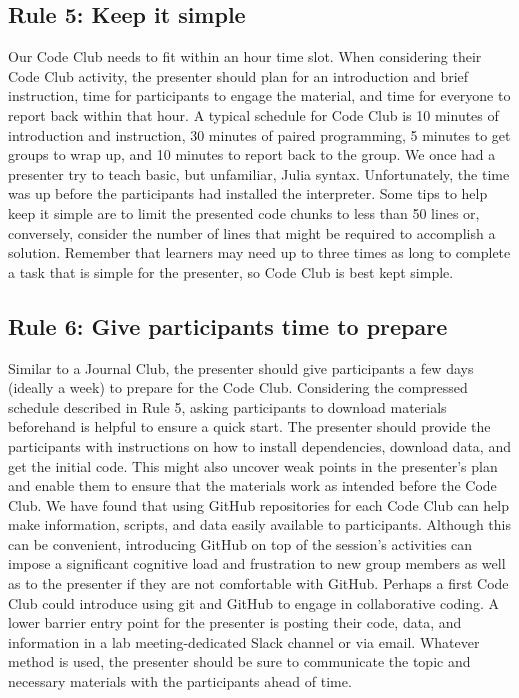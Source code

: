 \documentclass[
  11pt,
]{article}
\begin{document}
\hypertarget{rule-5-keep-it-simple}{%
\subsection{Rule 5: Keep it simple}\label{rule-5-keep-it-simple}}

Our Code Club needs to fit within an hour time slot. When considering
their Code Club activity, the presenter should plan for an introduction
and brief instruction, time for participants to engage the material, and
time for everyone to report back within that hour. A typical schedule
for Code Club is 10 minutes of introduction and instruction, 30 minutes
of paired programming, 5 minutes to get groups to wrap up, and 10
minutes to report back to the group. We once had a presenter try to
teach basic, but unfamiliar, Julia syntax. Unfortunately, the time was
up before the participants had installed the interpreter. Some tips to
help keep it simple are to limit the presented code chunks to less than
50 lines or, conversely, consider the number of lines that might be
required to accomplish a solution. Remember that learners may need up to
three times as long to complete a task that is simple for the presenter,
so Code Club is best kept simple.

\hypertarget{rule-6-give-participants-time-to-prepare}{%
\subsection{Rule 6: Give participants time to
prepare}\label{rule-6-give-participants-time-to-prepare}}

Similar to a Journal Club, the presenter should give participants a few
days (ideally a week) to prepare for the Code Club. Considering the
compressed schedule described in Rule 5, asking participants to download
materials beforehand is helpful to ensure a quick start. The presenter
should provide the participants with instructions on how to install
dependencies, download data, and get the initial code. This might also
uncover weak points in the presenter's plan and enable them to ensure
that the materials work as intended before the Code Club. We have found
that using GitHub repositories for each Code Club can help make
information, scripts, and data easily available to participants.
Although this can be convenient, introducing GitHub on top of the
session's activities can impose a significant cognitive load and
frustration to new group members as well as to the presenter if they are
not comfortable with GitHub. Perhaps a first Code Club could introduce
using git and GitHub to engage in collaborative coding. A lower barrier
entry point for the presenter is posting their code, data, and
information in a lab meeting-dedicated Slack channel or via email.
Whatever method is used, the presenter should be sure to communicate the
topic and necessary materials with the participants ahead of time.
\end{document}

